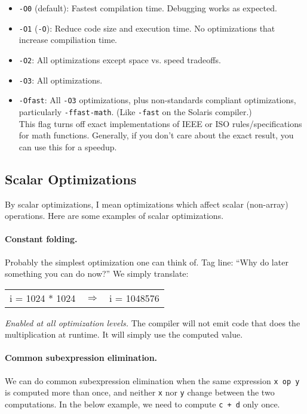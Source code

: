 \begin{itemize}[noitemsep]
\item {\tt -O0} (default): Fastest compilation time. Debugging works as expected.
\item {\tt -O1} ({\tt -O}): Reduce code size and execution time.
 No optimizations that increase compiliation time.
\item {\tt -O2}: All optimizations except space vs. speed tradeoffs.
\item {\tt -O3}: All optimizations.
\item {\tt -Ofast}: All {\tt -O3} optimizations, plus non-standards compliant optimizations,
      particularly {\tt -ffast-math}. (Like {\tt -fast} on the Solaris compiler.)\\[1em]
  This flag turns off exact implementations of IEEE or ISO rules/specifications for math
  functions. Generally, if you don't care about the exact result, you can use this for
  a speedup.
\end{itemize}

\subsection*{Scalar Optimizations}
By scalar optimizations, I mean optimizations
which affect scalar (non-array) operations. Here are some examples of scalar
optimizations.

\paragraph{Constant folding.} Probably the simplest optimization one can think of.
Tag line: ``Why do later something you can do now?'' We simply translate:

\begin{center}
\vspace*{-1em}
\begin{tabular}{lll}
i = 1024 * 1024 &
$\Longrightarrow$ &
i = 1048576
\end{tabular}
\end{center}

\noindent \emph{Enabled at all optimization levels.} The compiler will not emit
code that does the multiplication at runtime. It will simply use the
computed value.

\paragraph{Common subexpression elimination.} We can do common subexpression elimination
when the same expression {\tt x op y} is computed more than once, and
neither {\tt x} nor {\tt y} change between the two computations. In the
below example, we need to compute {\tt c + d} only once.


